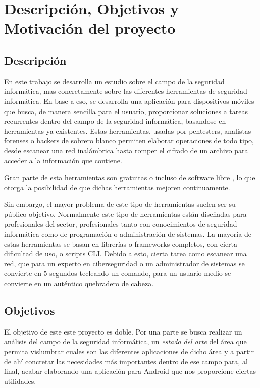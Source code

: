 \chapter{Descripción, Objetivos y Motivación del proyecto}

\section{Descripción}

En este trabajo se desarrolla un estudio sobre el campo de la seguridad informática, mas concretamente sobre las diferentes herramientas de seguridad informática. En base a eso, se desarrolla una aplicación para dispositivos móviles que busca, de manera sencilla para el usuario, proporcionar soluciones a tareas recurrentes dentro del campo de la seguridad informática, basandose en herramientas ya existentes. Estas herramientas, usadas por pentesters, analistas forenses o hackers de sobrero blanco permiten elaborar operaciones de todo tipo, desde escanear una red inalámbrica hasta romper el cifrado de un archivo para acceder a la información que contiene.

Gran parte de esta herramientas son gratuitas \cite{ofi-seg-inter} o incluso de software libre \cite{github-sec-showcase}, lo que otorga la posibilidad de que dichas herramientas mejoren continuamente.

Sin embargo, el mayor problema de este tipo de herramientas suelen ser su público objetivo. Normalmente este tipo de herramientas están diseñadas para profesionales del sector, profesionales tanto con conocimientos de seguridad informática como de programación o administración de sistemas. La mayoría de estas herramientas se basan en librerías o frameworks completos, con cierta dificultad de uso, o scripts CLI. Debido a esto, cierta tarea como escanear una red, que para un experto en ciberseguridad o un administrador de sistemas se convierte en 5 segundos tecleando un comando, para un usuario medio se convierte en un auténtico quebradero de cabeza.

\section{Objetivos}

El objetivo de este este proyecto es doble. Por una parte se busca realizar un análisis del campo de la seguridad informática, un \textit{estado del arte} del área que permita vislumbrar cuales son las diferentes aplicaciones de dicho área y a partir de ahí concretar las necesidades más importantes dentro de ese campo para, al final, acabar elaborando una aplicación para Android que nos proporcione ciertas utilidades.

